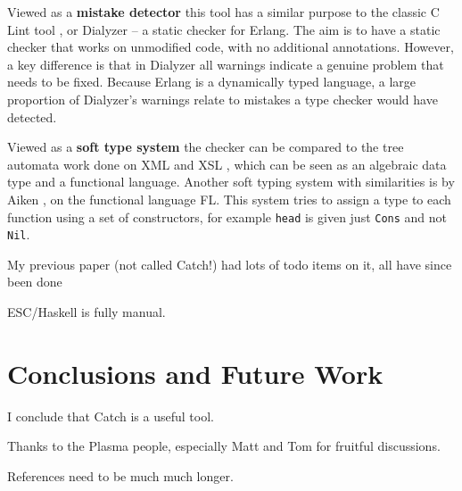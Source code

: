 \documentclass[preprint]{sigplanconf}
\newcommand{\T}[1]{\texttt{#1}}
\begin{document}
Viewed as a \textbf{mistake detector} this tool has a similar purpose to the classic C Lint tool \cite{lint}, or Dialyzer \cite{dialyzer} -- a static checker for Erlang. The aim is to have a static checker that works on unmodified code, with no additional annotations. However, a key difference is that in Dialyzer all warnings indicate a genuine problem that needs to be fixed. Because Erlang is a dynamically typed language, a large proportion of Dialyzer's warnings relate to mistakes a type checker would have detected.

Viewed as a \textbf{soft type system} the checker can be compared to the tree automata work done on XML and XSL \cite{static_xslt}, which can be seen as an algebraic data type and a functional language. Another soft typing system with similarities is by Aiken \cite{type:dynamic}, on the functional language FL. This system tries to assign a type to each function using a set of constructors, for example \T{head} is given just \T{Cons} and not \T{Nil}.

My previous paper (not called Catch!) had lots of todo items on it, all have since been done

ESC/Haskell is fully manual.


\section{Conclusions and Future Work}
\label{sec:conclusion}

I conclude that Catch is a useful tool.




%

\acks

Thanks to the Plasma people, especially Matt and Tom for fruitful discussions.

References need to be much much longer.



\end{document}
